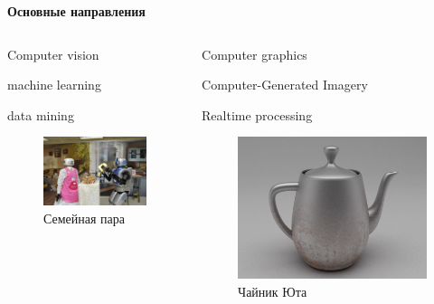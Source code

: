 \documentclass{beamer}
\begin{document}
	\begin{frame}
		
		\centering
		\textbf{Основные направления}
		
		\begin{columns}
			\begin{column}{0.3\textwidth}
				
				Computer vision
				
				machine learning
				
				data mining
				\begin{figure}
				\includegraphics[width=\textwidth]{images/Computer_vision.png}
				\caption{Семейная пара}
				\end{figure}
			\end{column}
			
			\begin{column}{0.4\textwidth}
				
				Computer graphics
				
				Computer-Generated Imagery
				
				Realtime processing
				\begin{figure}
				\includegraphics[width=\textwidth]{images/Utah_teapot.png}
				\caption{Чайник Юта}
				\end{figure}
				

\end{column}
\end{columns}
\end{frame}
\end{document}
